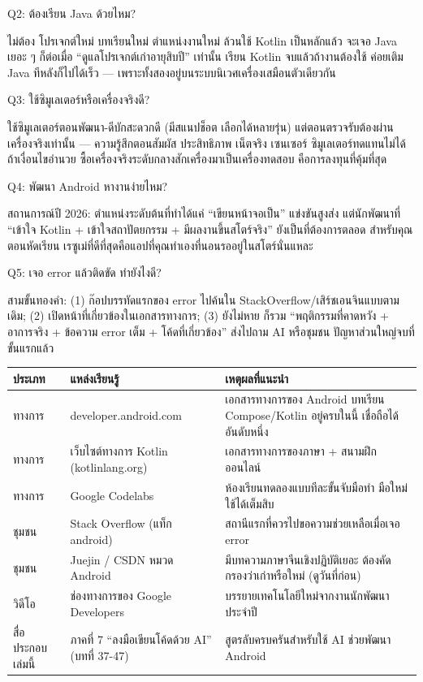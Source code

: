 Q2: ต้องเรียน Java ด้วยไหม?

ไม่ต้อง โปรเจกต์ใหม่ บทเรียนใหม่ ตำแหน่งงานใหม่ ล้วนใช้ Kotlin เป็นหลักแล้ว จะเจอ Java เยอะ ๆ ก็ต่อเมื่อ “ดูแลโปรเจกต์เก่าอายุสิบปี” เท่านั้น เรียน Kotlin จบแล้วถ้างานต้องใช้ ค่อยเติม Java ทีหลังก็ไปได้เร็ว — เพราะทั้งสองอยู่บนระบบนิเวศเครื่องเสมือนตัวเดียวกัน

Q3: ใช้ซิมูเลเตอร์หรือเครื่องจริงดี?

ใช้ซิมูเลเตอร์ตอนพัฒนา-ดีบักสะดวกดี (มีสแนปช็อต เลือกได้หลายรุ่น) แต่ตอนตรวจรับต้องผ่านเครื่องจริงเท่านั้น — ความรู้สึกตอนสัมผัส ประสิทธิภาพ เน็ตจริง เซนเซอร์ ซิมูเลเตอร์ทดแทนไม่ได้ ถ้าเงื่อนไขอำนวย ซื้อเครื่องจริงระดับกลางสักเครื่องมาเป็นเครื่องทดสอบ คือการลงทุนที่คุ้มที่สุด

Q4: พัฒนา Android หางานง่ายไหม?

สถานการณ์ปี 2026: ตำแหน่งระดับต้นที่ทำได้แค่ “เขียนหน้าจอเป็น” แข่งขันสูงส่ง แต่นักพัฒนาที่ “เข้าใจ Kotlin + เข้าใจสถาปัตยกรรม + มีผลงานขึ้นสโตร์จริง” ยังเป็นที่ต้องการตลอด สำหรับคุณตอนหัดเรียน เรซูเม่ที่ดีที่สุดคือแอปที่คุณทำเองที่นอนรออยู่ในสโตร์นั่นแหละ

Q5: เจอ error แล้วติดขัด ทำยังไงดี?

สามขั้นทองคำ: (1) ก๊อปบรรทัดแรกของ error ไปค้นใน StackOverflow/เสิร์ชเอนจินแบบตามเดิม; (2) เปิดหน้าที่เกี่ยวข้องในเอกสารทางการ; (3) ยังไม่หาย ก็รวม “พฤติกรรมที่คาดหวัง + อาการจริง + ข้อความ error เต็ม + โค้ดที่เกี่ยวข้อง” ส่งไปถาม AI หรือชุมชน ปัญหาส่วนใหญ่จบที่ขั้นแรกแล้ว


\begin{center}
\begin{tabularx}{\linewidth}{|X|X|X|}
\hline
\textbf{ประเภท} & \textbf{แหล่งเรียนรู้} & \textbf{เหตุผลที่แนะนำ} \tabularnewline
\hline
ทางการ & developer.android.com & เอกสารทางการของ Android บทเรียน Compose/Kotlin อยู่ครบในนี้ เชื่อถือได้อันดับหนึ่ง \tabularnewline
ทางการ & เว็บไซต์ทางการ Kotlin (kotlinlang.org) & เอกสารทางการของภาษา + สนามฝึกออนไลน์ \tabularnewline
ทางการ & Google Codelabs & ห้องเรียนทดลองแบบทีละขั้นจับมือทำ มือใหม่ใช้ได้เต็มสิบ \tabularnewline
ชุมชน & Stack Overflow (แท็ก android) & สถานีแรกที่ควรไปขอความช่วยเหลือเมื่อเจอ error \tabularnewline
ชุมชน & Juejin / CSDN หมวด Android & มีบทความภาษาจีนเชิงปฏิบัติเยอะ ต้องคัดกรองว่าเก่าหรือใหม่ (ดูวันที่ก่อน) \tabularnewline
วิดีโอ & ช่องทางการของ Google Developers & บรรยายเทคโนโลยีใหม่จากงานนักพัฒนาประจำปี \tabularnewline
สื่อประกอบเล่มนี้ & ภาคที่ 7 “ลงมือเขียนโค้ดด้วย AI” (บทที่ 37-47) & สูตรลับครบครันสำหรับใช้ AI ช่วยพัฒนา Android \tabularnewline
\hline
\end{tabularx}
\end{center}


